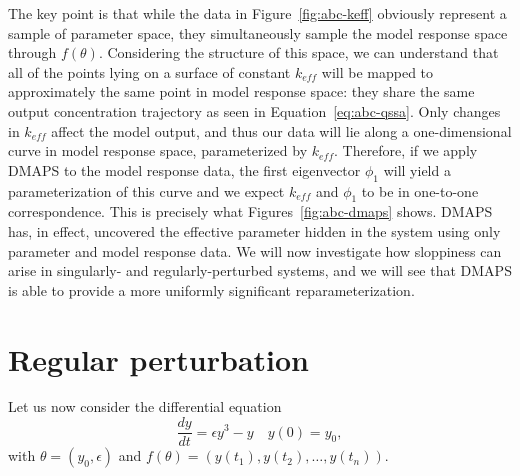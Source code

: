 The key point is that while the data in Figure~\ref{fig:abc-keff}
obviously represent a sample of parameter space, they simultaneously
sample the model response space through $f(\theta)$. Considering the
structure of this space, we can understand that all of the points
lying on a surface of constant $k_{eff}$ will be mapped to
approximately the same point in model response space: they share the
same output concentration trajectory as seen in
Equation~\ref{eq:abc-qssa}. Only changes in $k_{eff}$ affect the model
output, and thus our data will lie along a one-dimensional curve in
model response space, parameterized by $k_{eff}$. Therefore, if we
apply DMAPS to the model response data, the first eigenvector $\phi_1$
will yield a parameterization of this curve and we expect $k_{eff}$
and $\phi_1$ to be in one-to-one correspondence. This is precisely
what Figures~\ref{fig:abc-dmaps} shows. DMAPS has, in effect,
uncovered the effective parameter hidden in the system using only
parameter and model response data. We will now investigate how
sloppiness can arise in singularly- and regularly-perturbed systems,
and we will see that DMAPS is able to provide a more uniformly
significant reparameterization.


\section{Regular perturbation}

Let us now consider the differential equation
%
\begin{equation}
  \frac{dy}{dt} = \epsilon y^3 - y
  \quad
  y(0) = y_0 ,
  \label{1D-model-regpert}
\end{equation}
%
with $\theta = (y_0, \epsilon)$ and
$f(\theta) = \left(y(t_1), y(t_2), \dots, y(t_n) \right)$.

